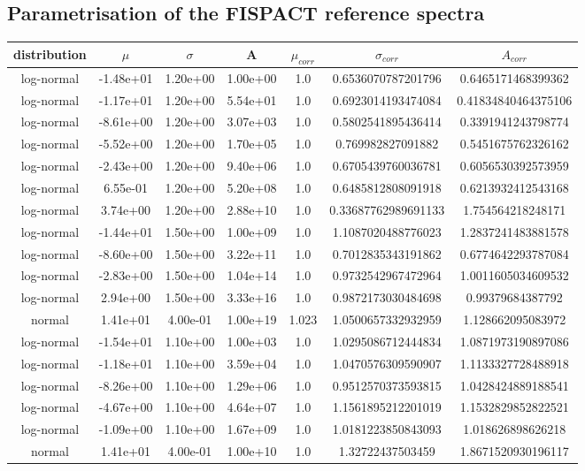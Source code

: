 \documentclass[a4paper, 12pt]{article}
\begin{document}
\begin{appendices}
\section{Parametrisation of the FISPACT reference spectra}
\begin{table}
\begin{tabular}{ccccccc}
distribution&$\mu$&$\sigma$&A&$\mu_{corr}$&$\sigma_{corr}$&$A_{corr}$\\
\hline
log-normal&-1.48e+01&1.20e+00&1.00e+00&1.0&0.6536070787201796&0.6465171468399362\\
log-normal&-1.17e+01&1.20e+00&5.54e+01&1.0&0.6923014193474084&0.41834840464375106\\
log-normal&-8.61e+00&1.20e+00&3.07e+03&1.0&0.5802541895436414&0.3391941243798774\\
log-normal&-5.52e+00&1.20e+00&1.70e+05&1.0&0.769982827091882&0.5451675762326162\\
log-normal&-2.43e+00&1.20e+00&9.40e+06&1.0&0.6705439760036781&0.6056530392573959\\
log-normal&6.55e-01&1.20e+00&5.20e+08&1.0&0.6485812808091918&0.6213932412543168\\
log-normal&3.74e+00&1.20e+00&2.88e+10&1.0&0.33687762989691133&1.754564218248171\\
\hline
log-normal&-1.44e+01&1.50e+00&1.00e+09&1.0&1.1087020488776023&1.2837241483881578\\
log-normal&-8.60e+00&1.50e+00&3.22e+11&1.0&0.7012835343191862&0.6774642293787084\\
log-normal&-2.83e+00&1.50e+00&1.04e+14&1.0&0.9732542967472964&1.0011605034609532\\
log-normal&2.94e+00&1.50e+00&3.33e+16&1.0&0.9872173030484698&0.99379684387792\\
normal&1.41e+01&4.00e-01&1.00e+19&1.023&1.0500657332932959&1.128662095083972\\
\hline
log-normal&-1.54e+01&1.10e+00&1.00e+03&1.0&1.0295086712444834&1.0871973190897086\\
log-normal&-1.18e+01&1.10e+00&3.59e+04&1.0&1.0470576309590907&1.1133327728488918\\
log-normal&-8.26e+00&1.10e+00&1.29e+06&1.0&0.9512570373593815&1.0428424889188541\\
log-normal&-4.67e+00&1.10e+00&4.64e+07&1.0&1.1561895212201019&1.1532829852822521\\
log-normal&-1.09e+00&1.10e+00&1.67e+09&1.0&1.0181223850843093&1.018626898626218\\
normal&1.41e+01&4.00e-01&1.00e+10&1.0&1.32722437503459&1.8671520930196117\\

\end{tabular}
\end{table}
\end{appendices}
\end{document}
